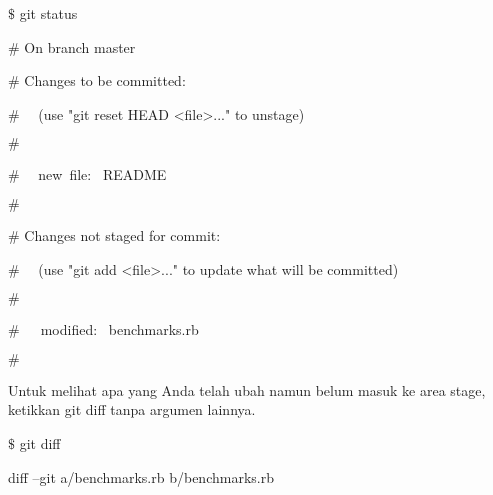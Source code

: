 \vspace{14pt}
\noindent 
{\fontsize{14pt}{14pt}\selectfont  $  \$  $ git status \\} \par
\noindent 
{\fontsize{14pt}{14pt}\selectfont  $  \#  $ On branch master \\} \par
\noindent 
{\fontsize{14pt}{14pt}\selectfont  $  \#  $ Changes to be committed: \\} \par
\noindent 
{\fontsize{14pt}{14pt}\selectfont  $  \#  $~~ (use "git reset HEAD <file>..." to unstage) \\} \par
\noindent 
{\fontsize{14pt}{14pt}\selectfont  $  \#  $ \\} \par
\noindent 
{\fontsize{14pt}{14pt}\selectfont  $  \#  $~~ new~file:~  README \\} \par
\noindent 
{\fontsize{14pt}{14pt}\selectfont  $  \#  $ \\} \par
\noindent 
{\fontsize{14pt}{14pt}\selectfont  $  \#  $ Changes not staged for commit: \\} \par
\noindent 
{\fontsize{14pt}{14pt}\selectfont  $  \#  $~~ (use "git add <file>..." to update what will be committed) \\} \par
\noindent 
{\fontsize{14pt}{14pt}\selectfont  $  \#  $ \\} \par
\noindent 
{\fontsize{14pt}{14pt}\selectfont  $  \#  $~~~modified:~  benchmarks.rb \\} \par
\noindent 
{\fontsize{14pt}{14pt}\selectfont  $  \#  $ \\} \par
\noindent 
{\fontsize{14pt}{14pt}\selectfont Untuk melihat apa yang Anda telah ubah namun belum masuk ke area stage, ketikkan $  $git diff $  $tanpa argumen lainnya. \\} \par
\noindent 
{\fontsize{14pt}{14pt}\selectfont  $  \$  $ git diff \\} \par
\noindent 
{\fontsize{14pt}{14pt}\selectfont diff --git a/benchmarks.rb b/benchmarks.rb \\} \par

